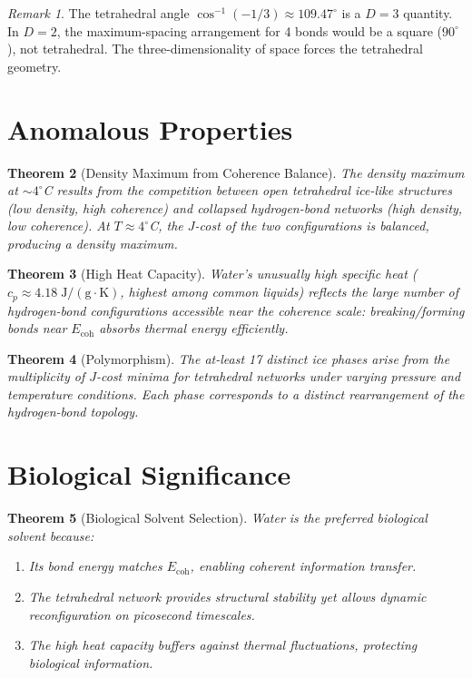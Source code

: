 \documentclass[12pt,a4paper]{article}
\newtheorem{theorem}{Theorem}[section]
\theoremstyle{definition}
\theoremstyle{remark}
\newtheorem{remark}[theorem]{Remark}
\begin{document}
\begin{remark}
The tetrahedral angle $\cos^{-1}(-1/3) \approx 109.47^\circ$ is a
$D = 3$ quantity.  In $D = 2$, the maximum-spacing arrangement for
4 bonds would be a square ($90^\circ$), not tetrahedral.  The
three-dimensionality of space forces the tetrahedral geometry.
\end{remark}

\section{Anomalous Properties}
\label{sec:anomalies}

\begin{theorem}[Density Maximum from Coherence Balance]
The density maximum at $\sim 4^\circ$C results from the competition
between open tetrahedral ice-like structures (low density, high
coherence) and collapsed hydrogen-bond networks (high density, low
coherence).  At $T \approx 4^\circ$C, the $J$-cost of the two
configurations is balanced, producing a density maximum.
\end{theorem}

\begin{theorem}[High Heat Capacity]
Water's unusually high specific heat
($c_p \approx 4.18\;\mathrm{J/(g \cdot K)}$, highest among common
liquids) reflects the large number of hydrogen-bond configurations
accessible near the coherence scale: breaking/forming bonds near
$E_{\mathrm{coh}}$ absorbs thermal energy efficiently.
\end{theorem}

\begin{theorem}[Polymorphism]
The at-least 17 distinct ice phases arise from the multiplicity
of $J$-cost minima for tetrahedral networks under varying
pressure and temperature conditions.  Each phase corresponds to a
distinct rearrangement of the hydrogen-bond topology.
\end{theorem}

\section{Biological Significance}
\label{sec:biology}

\begin{theorem}[Biological Solvent Selection]
Water is the preferred biological solvent because:
\begin{enumerate}[label=(\roman*)]
  \item Its bond energy matches $E_{\mathrm{coh}}$, enabling
  coherent information transfer.
  \item The tetrahedral network provides structural stability yet
  allows dynamic reconfiguration on picosecond timescales.
  \item The high heat capacity buffers against thermal
  fluctuations, protecting biological information.
\end{enumerate}
\end{theorem}
\end{document}
